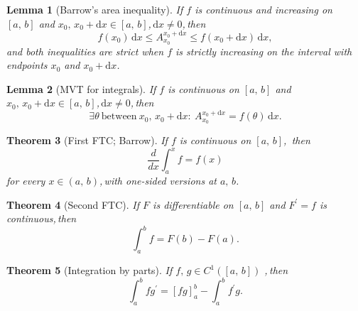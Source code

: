 \documentclass[11pt,reqno]{amsart}
\theoremstyle{redplain}
\newtheorem{theorem}{Theorem}
\newtheorem{lemma}[theorem]{Lemma}
\begin{document}
\begin{lemma}[Barrow's area inequality]
\label{lem:barrow-area} If $f$ is continuous and increasing on $%
[a,\,\allowbreak b]$ and $x_0,\,\allowbreak x_0+\mathrm{d}x\in[%
a,\,\allowbreak b]$,\,\allowbreak $\mathrm{d}x\ne0$,\,\allowbreak then 
\begin{equation}  \label{eq:barrow-area}
f(x_0)\,\mathrm{d}x\le A_{x_0}^{x_0+\mathrm{d}x}\le f(x_0+\mathrm{d}x)\,%
\mathrm{d}x,
\end{equation}
and both inequalities are strict when $f$ is strictly increasing on the
interval with endpoints $x_0$ and $x_0+\mathrm{d}x$.
\end{lemma}

\begin{lemma}[MVT for integrals]
\label{lem:mvt-int} If $f$ is continuous on $[a,\,\allowbreak b]$ and $%
x_0,\,\allowbreak x_0+\mathrm{d}x\in[a,\,\allowbreak b]$,\,\allowbreak $%
\mathrm{d}x\ne0$,\,\allowbreak then 
\begin{equation}  \label{eq:mvt-int}
\exists\theta\ \text{between}\ x_0,\,\allowbreak x_0+\mathrm{d}x:\
A_{x_0}^{x_0+\mathrm{d}x}=f(\theta)\,\mathrm{d}x.
\end{equation}
\end{lemma}

\begin{theorem}[First FTC; Barrow]
\label{thm:fftc} If $f$ is continuous on $[a,\,\allowbreak b]$,\,\allowbreak
then 
\begin{equation}  \label{eq:fftc}
\frac{d}{dx}\int_a^x f=f(x)
\end{equation}
for every $x\in(a,\,\allowbreak b)$,\,\allowbreak with one-sided versions at 
$a,\,\allowbreak b$.
\end{theorem}

\begin{theorem}[Second FTC]
\label{thm:second-ftc} If $F$ is differentiable on $[a,\,\allowbreak b]$ and 
$F^{\prime }=f$ is continuous,\,\allowbreak then 
\begin{equation}  \label{eq:second-ftc}
\int_a^b f=F(b)-F(a).
\end{equation}
\end{theorem}

\begin{theorem}[Integration by parts]
\label{thm:ibp} If $f,\,\allowbreak g\in C^1([a,\,\allowbreak b])$%
,\,\allowbreak then 
\begin{equation}  \label{eq:ibp}
\int_a^b fg^{\prime }=[fg]_a^b-\int_a^b f^{\prime }g.
\end{equation}
\end{theorem}
\end{document}
